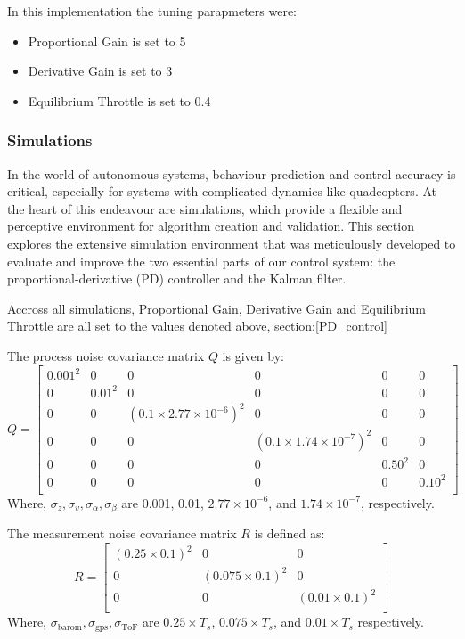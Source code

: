 \documentclass{article}
\begin{document}
In this implementation the tuning parapmeters were: 
\begin{itemize}
  \item Proportional Gain is set to 5 
  \item Derivative Gain is set to 3 
  \item Equilibrium Throttle is set to 0.4
\end{itemize}

\subsubsection{Simulations}
In the world of autonomous systems, behaviour prediction and control accuracy is critical, especially for systems with complicated dynamics like quadcopters. At the heart of this endeavour are simulations, which provide a flexible and perceptive environment for algorithm creation and validation. 
This section explores the extensive simulation environment that was meticulously developed to evaluate and improve the two essential parts of our control system: the proportional-derivative (PD) controller and the Kalman filter.

Accross all simulations, Proportional Gain, Derivative Gain and Equilibrium Throttle are all set to the values denoted above, section:\ref{PD_control}

The process noise covariance matrix \( Q \) is given by:
\begin{equation}
Q = \begin{bmatrix}
0.001^2 & 0 & 0 & 0 & 0 & 0 \\
0 & 0.01^2 & 0 & 0 & 0 & 0 \\
0 & 0 & (0.1 \times 2.77 \times 10^{-6})^2 & 0 & 0 & 0 \\
0 & 0 & 0 & (0.1 \times 1.74 \times 10^{-7})^2 & 0 & 0 \\
0 & 0 & 0 & 0 & 0.50^2 & 0 \\
0 & 0 & 0 & 0 & 0 & 0.10^2 \\
\end{bmatrix}
\end{equation}
Where, \( \sigma_z, \sigma_v, \sigma_\alpha, \sigma_\beta \) are 0.001, 0.01, \( 2.77 \times 10^{-6} \), and \( 1.74 \times 10^{-7} \), respectively.
\bigskip

The measurement noise covariance matrix \( R \) is defined as:
\begin{equation}
R = \begin{bmatrix}
(0.25 \times 0.1)^2 & 0 & 0 \\
0 & (0.075 \times 0.1)^2 & 0 \\
0 & 0 & (0.01 \times 0.1)^2 \\
\end{bmatrix}
\end{equation}
Where, \( \sigma_{\text{barom}}, \sigma_{\text{gps}}, \sigma_{\text{ToF}} \) are \( 0.25 \times T_s \), \( 0.075 \times T_s \), and \( 0.01 \times T_s \) respectively.
\end{document}
